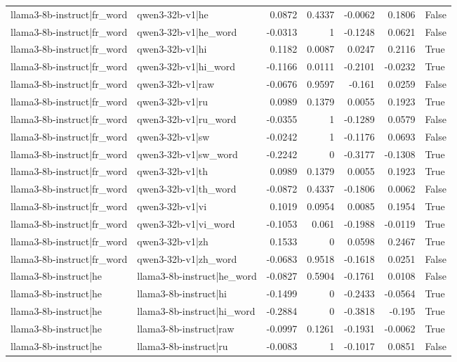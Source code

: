 \begin{table}
\begin{tabular}{l l r r r r l}
llama3-8b-instruct|fr_word & qwen3-32b-v1|he & 0.0872 & 0.4337 & -0.0062 & 0.1806 & False \\
llama3-8b-instruct|fr_word & qwen3-32b-v1|he_word & -0.0313 & 1 & -0.1248 & 0.0621 & False \\
llama3-8b-instruct|fr_word & qwen3-32b-v1|hi & 0.1182 & 0.0087 & 0.0247 & 0.2116 & True \\
llama3-8b-instruct|fr_word & qwen3-32b-v1|hi_word & -0.1166 & 0.0111 & -0.2101 & -0.0232 & True \\
llama3-8b-instruct|fr_word & qwen3-32b-v1|raw & -0.0676 & 0.9597 & -0.161 & 0.0259 & False \\
llama3-8b-instruct|fr_word & qwen3-32b-v1|ru & 0.0989 & 0.1379 & 0.0055 & 0.1923 & True \\
llama3-8b-instruct|fr_word & qwen3-32b-v1|ru_word & -0.0355 & 1 & -0.1289 & 0.0579 & False \\
llama3-8b-instruct|fr_word & qwen3-32b-v1|sw & -0.0242 & 1 & -0.1176 & 0.0693 & False \\
llama3-8b-instruct|fr_word & qwen3-32b-v1|sw_word & -0.2242 & 0 & -0.3177 & -0.1308 & True \\
llama3-8b-instruct|fr_word & qwen3-32b-v1|th & 0.0989 & 0.1379 & 0.0055 & 0.1923 & True \\
llama3-8b-instruct|fr_word & qwen3-32b-v1|th_word & -0.0872 & 0.4337 & -0.1806 & 0.0062 & False \\
llama3-8b-instruct|fr_word & qwen3-32b-v1|vi & 0.1019 & 0.0954 & 0.0085 & 0.1954 & True \\
llama3-8b-instruct|fr_word & qwen3-32b-v1|vi_word & -0.1053 & 0.061 & -0.1988 & -0.0119 & True \\
llama3-8b-instruct|fr_word & qwen3-32b-v1|zh & 0.1533 & 0 & 0.0598 & 0.2467 & True \\
llama3-8b-instruct|fr_word & qwen3-32b-v1|zh_word & -0.0683 & 0.9518 & -0.1618 & 0.0251 & False \\
llama3-8b-instruct|he & llama3-8b-instruct|he_word & -0.0827 & 0.5904 & -0.1761 & 0.0108 & False \\
llama3-8b-instruct|he & llama3-8b-instruct|hi & -0.1499 & 0 & -0.2433 & -0.0564 & True \\
llama3-8b-instruct|he & llama3-8b-instruct|hi_word & -0.2884 & 0 & -0.3818 & -0.195 & True \\
llama3-8b-instruct|he & llama3-8b-instruct|raw & -0.0997 & 0.1261 & -0.1931 & -0.0062 & True \\
llama3-8b-instruct|he & llama3-8b-instruct|ru & -0.0083 & 1 & -0.1017 & 0.0851 & False \\

\end{tabular}
\end{table}
